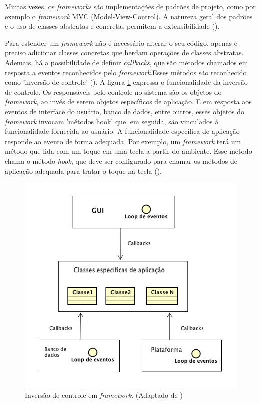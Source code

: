Muitas vezes, os \textit{frameworks} são implementações de padrões de projeto, como por exemplo o \textit{framework} MVC (Model-View-Control). A natureza geral dos padrões e o uso de classes abstratas e concretas permitem a extensibilidade (\cite{sommerville:2013}).

Para estender um \textit{framework} não é necessário alterar o seu código, apenas é preciso adicionar classes concretas que herdam operações de classes abstratas. Ademais, há a possibilidade de definir \textit{callbacks}, que são métodos chamados em resposta a eventos reconhecidos pelo \textit{framework}.Esses métodos são reconhecido como 'inversão de controle' (\cite{schmidt:2004}). A figura \ref{inversaodecontrole} expressa o funcionalidade da inversão de controle. Os responsáveis pelo controle no sistema são os objetos do \textit{framework}, ao invés de serem objetos específicos de aplicação. E em resposta aos eventos de interface do usuário, banco de dados, entre outros, esses objetos do \textit{framework} invocam 'métodos hook' que, em seguida, são vinculados à funcionalidade fornecida ao usuário. A funcionalidade específica de aplicação responde ao evento de forma adequada. Por exemplo, um \textit{framework} terá um método que lida com um toque em uma tecla a partir do ambiente. Esse método chama o método \textit{hook}, que deve ser configurado para chamar os métodos de aplicação adequada para tratar o toque na tecla (\cite{sommerville:2013}).

\begin{figure}[h!]
	\centering
	\includegraphics[scale=0.6]{fig/inversaodecontrole.png}
	\caption{Inversão de controle em \textit{framework}. (Adaptado de \cite{sommerville:2013})}
	\label{inversaodecontrole}
\end{figure}

